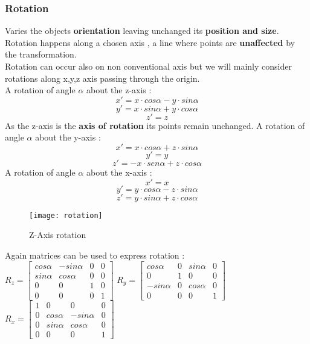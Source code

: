 \subsubsection{Rotation}
Varies the objects \textbf{orientation} leaving unchanged its \textbf{position and size}. Rotation happens along a chosen axis , a line where points are \textbf{unaffected} by the transformation.\\
Rotation can occur also on non conventional axis but we will mainly consider rotations along x,y,z axis passing through the origin.\\
A rotation of angle $\alpha$ about the z-axis :
$$ x' = x \cdot cos\alpha - y \cdot sin\alpha$$
$$ y' = x \cdot sin\alpha + y \cdot cos\alpha$$
$$ z' = z$$
As the z-axis is the \textbf{axis of rotation} its points remain unchanged.
A rotation of angle $\alpha$ about the y-axis :
$$ x' = x \cdot cos\alpha + z \cdot sin\alpha$$
$$ y' = y $$
$$ z' = -x \cdot sen\alpha + z \cdot cos\alpha$$
A rotation of angle $\alpha$ about the x-axis :
$$ x' = x$$
$$ y' = y \cdot cos\alpha -z \cdot sin\alpha$$
$$ z' = y \cdot sin\alpha +z \cdot cos\alpha$$

\begin{figure}[H]
\centering
  \texttt{[image: rotation]}
  \caption{Z-Axis rotation}
 \end{figure}
 
Again matrices can be used to express rotation :\\ \hfill
$	
R_z= \begin{bmatrix}
       cos\alpha & -sin\alpha & 0 & 0        \\[0.1em]
       sin\alpha & cos\alpha & 0 & 0		    \\[0.1em]
       0 & 0 & 1 & 0							\\[0.1em]
       0 & 0 & 0 & 1
     \end{bmatrix} 
$ $     
R_y= \begin{bmatrix}
       cos\alpha & 0 & sin\alpha & 0         \\[0.1em]
       0 & 1 & 0 & 0		    				    \\[0.1em]
       -sin\alpha & 0 & cos\alpha & 0	    \\[0.1em]
       0 & 0 & 0 & 1
     \end{bmatrix}
$ $    
R_x= \begin{bmatrix}
       1 & 0 & 0 & 0          			    \\[0.1em]
       0 & cos\alpha & -sin\alpha & 0		\\[0.1em]
       0 & sin\alpha & cos\alpha & 0			\\[0.1em]
       0 & 0 & 0 & 1
     \end{bmatrix}  
$
\newpage
